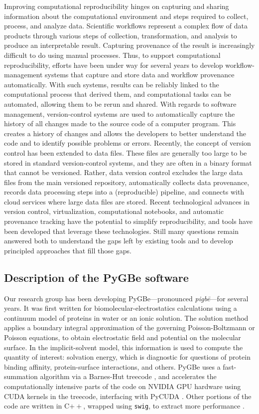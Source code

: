 Improving computational reproducibility hinges on capturing and sharing information about the computational environment and steps required to collect, process, and analyze data.
Scientific workflows represent a complex flow of data products through various steps of collection, transformation, and analysis to produce an interpretable result. 
Capturing provenance of the result is increasingly difficult to do using manual processes. 
Thus, to support computational reproducibility, efforts have been under way for several years to develop workflow-management systems that capture and store data and workflow provenance automatically. 
With such systems, results can be reliably linked to the computational process that derived them, and computational tasks can be automated, allowing them to be rerun and shared.
With regards to software management, version-control systems are used to automatically capture the history of all changes made to the source code of a computer program. 
This creates a history of changes and allows the developers to better understand the code and to identify possible problems or errors.
Recently, the concept of version control has been extended to data files. 
These files are generally too large to be stored in standard version-control systems, and they are often in a binary format that cannot be versioned. 
Rather, data version control excludes the large data files from the main versioned repository, automatically collects data provenance, records data processing steps into a (reproducible) pipeline, and connects with cloud services where large data files are stored.
Recent technological advances in version control, virtualization, computational notebooks, and automatic provenance tracking have the potential to simplify reproducibility, and tools have been developed that leverage these technologies.
Still many questions remain answered both to understand the gaps left by existing tools and to develop principled approaches that fill those gaps. 



\subsection{Description of the PyGBe software}

Our research group has been developing PyGBe---pronounced \emph{pigb\={e}}---for several years. 
It was first written for biomolecular-electrostatics calculations using a continuum model of proteins in water or an ionic solution. 
The solution method applies a boundary integral approximation of the governing Poisson-Boltzmann or Poisson equations, to obtain electrostatic field and potential on the molecular surface. 
In the implicit-solvent model, this information is used to compute the quantity of interest: solvation energy, which is diagnostic for questions of protein binding affinity, protein-surface interactions, and others. 
PyGBe uses a fast-summation algorithm via a Barnes-Hut treecode \cite{BarnesHut1986}, and accelerates the computationally intensive parts of the code on NVIDIA GPU hardware using CUDA kernels in the treecode, interfacing with PyCUDA \cite{klockner2012pycuda}. 
Other portions of the code are written in C$++$, wrapped using \texttt{swig}, to extract more performance \cite{CooperETal2016}. 


